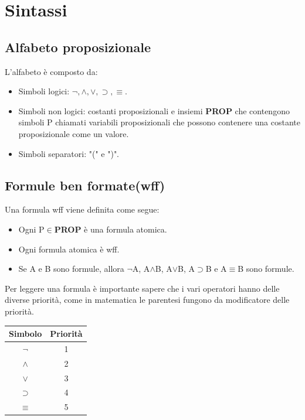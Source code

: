 \documentclass[../main.tex]{subfiles}
\begin{document}
    \section{Sintassi}
    \subsection{Alfabeto proposizionale}
    L'alfabeto è composto da:
    \begin{itemize}
        \item Simboli logici: $\lnot, \land, \lor,\supset , \equiv$.
        \item Simboli non logici: costanti proposizionali e insiemi \textbf{PROP} che contengono simboli P chiamati variabili proposizionali che possono contenere una costante proposizionale come un valore.
        \item Simboli separatori: "(" e ")".
    \end{itemize}

    \subsection{Formule ben formate(wff)}
    Una formula wff viene definita come segue:
    \begin{itemize}
        \item Ogni P$\in$\textbf{PROP} è una formula atomica.
        \item Ogni formula atomica è wff.
        \item Se A e B sono formule, allora $\lnot$A, A$\land$B, A$\lor$B, A$\supset$B e A$\equiv$B sono formule.
    \end{itemize}
    Per leggere una formula è importante sapere che i vari operatori hanno delle diverse priorità, come in matematica le parentesi fungono da modificatore delle priorità.
    \begin{center}
        \begin{tabular}{c|c}
            \textbf{Simbolo} & \textbf{Priorità}\\
            \hline
            $\lnot$ & 1\\
            $\land$ & 2\\
            $\lor$ & 3\\
            $\supset$ & 4\\
            $\equiv$ & 5\\
        \end{tabular}
    \end{center}
\end{document}
